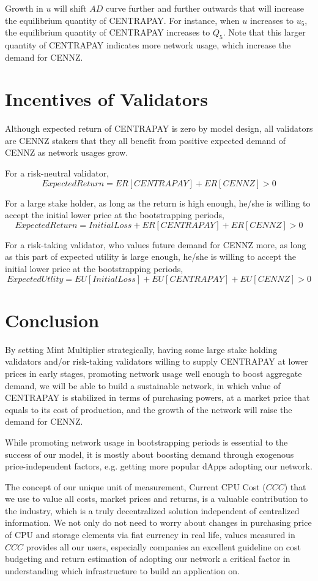 \documentclass{article}
\begin{document}
Growth in $u$ will shift $AD$ curve further and further outwards that will increase the equilibrium quantity of CENTRAPAY. For instance, when $u$ increases to $u_5$, the equilibrium quantity of CENTRAPAY increases to $Q_5$. Note that this larger quantity of CENTRAPAY indicates more network usage, which increase the demand for CENNZ. 

\section{Incentives of Validators}
Although expected return of CENTRAPAY is zero by model design, all validators are CENNZ stakers that they all benefit from positive expected demand of CENNZ as network usages grow.   \par

For a risk-neutral validator, 
$$Expected Return=ER[CENTRAPAY]+ER[CENNZ]>0$$

For a large stake holder, as long as the return is high enough, he/she is willing to accept the initial lower price at the bootstrapping periods,
$$Expected Return=Initial Loss+ER[CENTRAPAY]+ER[CENNZ]>0$$

For a risk-taking validator, who values future demand for CENNZ more, as long as this part of expected utility is large enough, he/she is willing to accept the initial lower price at the bootstrapping periods,
$$Expected Utlity=EU[Initial Loss]+EU[CENTRAPAY]+EU[CENNZ]>0$$

\section{Conclusion}
By setting Mint Multiplier strategically, having some large stake holding validators and/or risk-taking validators willing to supply CENTRAPAY at lower prices in early stages, promoting network usage well enough to boost aggregate demand, we will be able to build a sustainable network, in which value of CENTRAPAY is stabilized in terms of purchasing powers, at a market price that equals to its cost of production, and the growth of the network will raise the demand for CENNZ.\par

While promoting network usage in bootstrapping periods is essential to the success of our model, it is mostly about boosting demand through exogenous price-independent factors, e.g. getting more popular dApps adopting our network. \par

The concept of our unique unit of measurement, Current CPU Cost ($CCC$) that we use to value all costs, market prices and returns, is a valuable contribution to the industry, which is a truly decentralized solution independent of centralized information. We not only do not need to worry about changes in purchasing price of CPU and storage elements via fiat currency in real life, values measured in $CCC$ provides all our users, especially companies an excellent guideline on cost budgeting and return estimation of adopting our network a critical factor in understanding which infrastructure to build an application on. 
\end{document}
